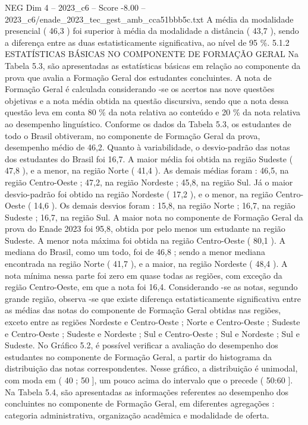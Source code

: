 \begin{textsample}{NEG Dim 4 – 2023\_c6 – Score -8.00 – 2023\_c6/enade\_2023\_tec\_gest\_amb\_cca51bbb5c.txt}
A média da modalidade presencial ( 46,3 ) foi superior à média da modalidade a distância ( 43,7 ), sendo a diferença entre as duas estatisticamente significativa, ao nível de 95 \%. 5.1.2 ESTATÍSTICAS BÁSICAS NO COMPONENTE DE FORMAÇÃO GERAL Na Tabela 5.3, são apresentadas as estatísticas básicas em relação ao componente da prova que avalia a Formação Geral dos estudantes concluintes.
A nota de Formação Geral é calculada considerando -se os acertos nas nove questões objetivas e a nota média obtida na questão discursiva, sendo que a nota dessa questão leva em conta 80 \% da nota relativa ao conteúdo e 20 \% da nota relativa ao desempenho linguístico.
Conforme os dados da Tabela 5.3, os estudantes de todo o Brasil obtiveram, no componente de Formação Geral da prova, desempenho médio de 46,2.
Quanto à variabilidade, o desvio-padrão das notas dos estudantes do Brasil foi 16,7.
A maior média foi obtida na região Sudeste ( 47,8 ), e a menor, na região Norte ( 41,4 ).
As demais médias foram : 46,5, na região Centro-Oeste ; 47,2, na região Nordeste ; 45,8, na região Sul.
Já o maior desvio-padrão foi obtido na região Nordeste ( 17,2 ), e o menor, na região Centro-Oeste ( 14,6 ).
Os demais desvios foram : 15,8, na região Norte ; 16,7, na região Sudeste ; 16,7, na região Sul.
A maior nota no componente de Formação Geral da prova do Enade 2023 foi 95,8, obtida por pelo menos um estudante na região Sudeste.
A menor nota máxima foi obtida na região Centro-Oeste ( 80,1 ).
A mediana do Brasil, como um todo, foi de 46,8 ; sendo a menor mediana encontrada na região Norte ( 41,7 ), e a maior, na região Nordeste ( 48,4 ).
A nota mínima nessa parte foi zero em quase todas as regiões, com exceção da região Centro-Oeste, em que a nota foi 16,4.
Considerando -se as notas, segundo grande região, observa -se que existe diferença estatisticamente significativa entre as médias das notas do componente de Formação Geral obtidas nas regiões, exceto entre as regiões Nordeste e Centro-Oeste ; Norte e Centro-Oeste ; Sudeste e Centro-Oeste ; Sudeste e Nordeste ; Sul e Centro-Oeste ; Sul e Nordeste ; Sul e Sudeste.
No Gráfico 5.2, é possível verificar a avaliação do desempenho dos estudantes no componente de Formação Geral, a partir do histograma da distribuição das notas correspondentes.
Nesse gráfico, a distribuição é unimodal, com moda em ( 40 ; 50 ], um pouco acima do intervalo que o precede ( 50:60 ].
Na Tabela 5.4, são apresentadas as informações referentes ao desempenho dos concluintes no componente de Formação Geral, em diferentes agregações : categoria administrativa, organização acadêmica e modalidade de oferta.

\end{textsample}
